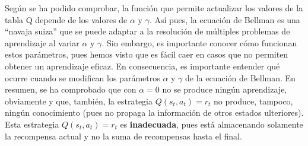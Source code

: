 \documentclass{article}
\begin{document}
Según se ha podido comprobar, la función que permite actualizar los valores de la tabla Q depende de los valores de $\alpha$ y $\gamma$. Así pues, la ecuación de Bellman es una ``navaja suiza'' que se puede adaptar a la resolución de múltiples problemas de aprendizaje al variar $\alpha$ y $\gamma$. Sin embargo, es importante conocer cómo funcionan estos parámetros, pues hemos visto que es fácil caer en casos que no permiten obtener un aprendizaje eficaz. En consecuencia, es importante entender qué ocurre cuando se modifican los parámetros $\alpha$ y $\gamma$ de la ecuación de Bellman. 
En resumen, se ha comprobado que con $\alpha=0$ no se produce ningún aprendizaje, obviamente y que, también, la estrategia $Q(s_t, a_t)=r_t$ no produce, tampoco, ningún conocimiento (pues no propaga la información de otros estados ulteriores). Esta estrategia $Q(s_t,a_t)=r_t$ es \textbf{inadecuada}, pues está almacenando solamente la recompensa actual y no la suma de recompensas hasta el final. 







\end{document}
